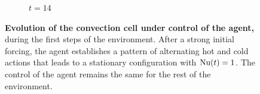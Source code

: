 \begin{figure}
\begin{subfigure}[t]{.22\textwidth}
    	\caption{$t=14$}
	\label{fig:rayleigh_field_14}
\end{subfigure}

\caption{\textbf{Evolution of the convection cell under control of the agent,} during the first steps of the environment. After a strong initial forcing, the agent establishes a pattern of alternating hot and cold actions that leads to a stationary configuration with $\text{Nu}(t) = 1$. The control of the agent remains the same for the rest of the environment.}
\label{fig:rayleigh_fields}
\end{figure} 
